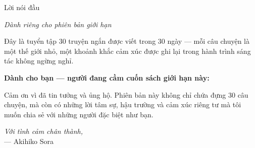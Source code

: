 
\thispagestyle{empty}
\vspace*{1.5cm}

\begin{center}
    \textcolor{sakura}{}
    \vspace{0.5cm}
    
    {\titlefont\large\textcolor{sakura_dark}{Lời nói đầu}}
    
    \vspace{0.3cm}
    
    {\footnotesize\textit{Dành riêng cho phiên bản giới hạn}}
    
    \vspace{0.5cm}
    \textcolor{sakura}{}
\end{center}

\vspace{1cm}

\noindent
Đây là tuyển tập 30 truyện ngắn được viết trong 30 ngày — mỗi câu chuyện là một thế giới nhỏ, một khoảnh khắc cảm xúc được ghi lại trong hành trình sáng tác không ngừng nghỉ.

\vspace{0.5cm}

\noindent
\textcolor{sakura_dark}{\textbf{Dành cho bạn — người đang cầm cuốn sách giới hạn này:}}

\vspace{0.3cm}

\noindent
Cảm ơn vì đã tin tưởng và ủng hộ. Phiên bản này không chỉ chứa đựng 30 câu chuyện, mà còn có những lời tâm sự, hậu trường và cảm xúc riêng tư mà tôi muốn chia sẻ với những người đặc biệt như bạn.

\vspace{0.3cm}

\begin{flushright}
    \textcolor{sakura_dark}{\textit{Với tình cảm chân thành,}}\\[0.3cm]
    {\handwritingfont\textcolor{sakura_dark}{--- Akihiko Sora}}
\end{flushright}

\clearpage